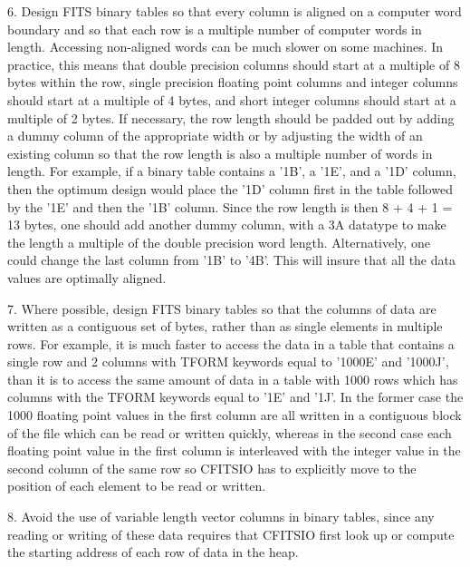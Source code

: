 6. Design FITS binary tables so that every column is aligned on a
computer word boundary and so that each row is a multiple number of
computer words in length.  Accessing non-aligned words can be much
slower on some machines.  In practice, this means that double precision
columns should start at a multiple of 8 bytes within the row, single
precision floating point columns and integer columns should start at a
multiple of 4 bytes, and short integer columns should start at a
multiple of 2 bytes.  If necessary, the row length should be padded out
by adding a dummy column of the appropriate width or by adjusting the
width of an existing column so that the row length is also a multiple
number of words in length.  For example, if a binary table contains a
'1B', a '1E', and a '1D' column, then the optimum design would place
the '1D' column first in the table followed by the '1E' and then the
'1B' column.  Since the row length is then 8 + 4 + 1 = 13 bytes, one
should add another dummy column, with a 3A datatype to make the length
a multiple of the double precision word length.  Alternatively, one
could change the last column from '1B' to '4B'. This will insure that
all the data values are optimally aligned.

7. Where possible, design FITS binary tables so that the columns of
data are written as a contiguous set of bytes, rather than as single
elements in multiple rows.  For example, it is much faster to access
the data in a table that contains a single row and 2 columns with TFORM
keywords equal to  '1000E' and '1000J', than it is to access the same
amount of data in a table with 1000 rows which has columns with the
TFORM keywords equal to '1E' and '1J'.  In the former case the 1000
floating point values in the first column are all written in a
contiguous block of the file which can be read or written quickly,
whereas in the second case each floating point value in the first
column is interleaved with the integer value in the second column of
the same row so CFITSIO has to explicitly move to the position of each
element to be read or written.

8. Avoid the use of variable length vector columns in binary tables,
since any reading or writing of these data requires that CFITSIO first
look up or compute the starting address of each row of data in the
heap.

